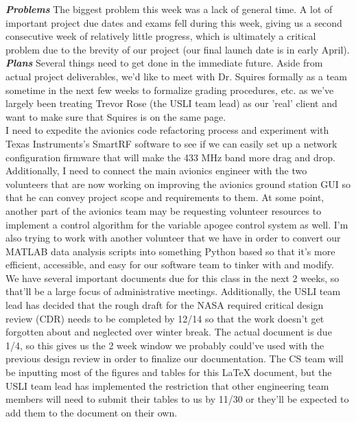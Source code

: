 \documentclass[onecolumn, draftclsnofoot, 10pt, compsoc]{IEEEtran}
\begin{document}
\textbf{\textit{{Problems}}}
\newline The biggest problem this week was a lack of general time. A lot of important project due dates and exams
fell during this week, giving us a second consecutive week of relatively little progress, which is ultimately
a critical problem due to the brevity of our project (our final launch date is in early April). \\

\textbf{\textit{{Plans}}}
\newline Several things need to get done in the immediate future. Aside from actual project deliverables, we'd like
to meet with Dr. Squires formally as a team sometime in the next few weeks to formalize grading procedures,
etc. as we've largely been treating Trevor Rose (the USLI team lead) as our 'real' client and want to make
sure that Squires is on the same page. \\

I need to expedite the avionics code refactoring process and experiment with Texas Instruments's SmartRF
software to see if we can easily set up a network configuration firmware that will make the 433 MHz band
more drag and drop. Additionally, I need to connect the main avionics engineer with the two volunteers
that are now working on improving the avionics ground station GUI so that he can convey project scope
and requirements to them. At some point, another part of the avionics team may be requesting volunteer
resources to implement a control algorithm for the variable apogee control system as well. I'm also trying
to work with another volunteer that we have in order to convert our MATLAB data analysis scripts into
something Python based so that it's more efficient, accessible, and easy for our software team to tinker
with and modify. \\

We have several important documents due for this class in the next 2 weeks, so that'll be a large focus
of administrative meetings. Additionally, the USLI team lead has decided that the rough draft for the 
NASA required critical design review (CDR) needs to be completed by 12/14 so that the work doesn't get
forgotten about and neglected over winter break. The actual document is due 1/4, so this gives us the
2 week window we probably could've used with the previous design review in order to finalize our 
documentation. The CS team will be inputting most of the figures and tables for this LaTeX document, but
the USLI team lead has implemented the restriction that other engineering team members will need to submit
their tables to us by 11/30 or they'll be expected to add them to the document on their own. \\
\end{document}
